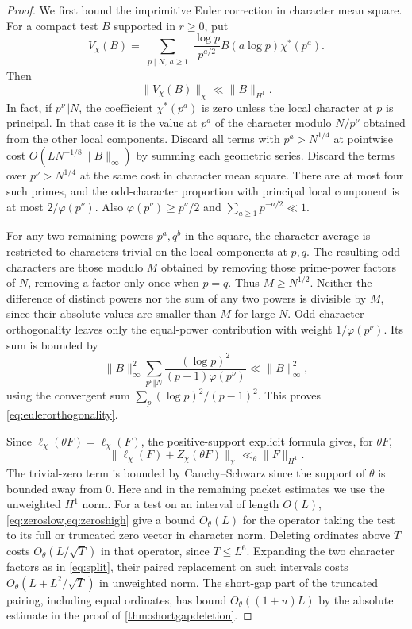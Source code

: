 \documentclass[11pt,a4paper]{article}
\numberwithin{equation}{section}
\begin{document}
\begin{proof}
We first bound the imprimitive Euler correction in character
mean square. For a compact test $B$ supported in $r\ge0$, put
\[
 V_\chi(B)=
 \sum_{\substack{p\mid N,\ a\ge1}}
       \frac{\log p}{p^{a/2}}B(a\log p)\chi^*(p^a).
\]
Then
\begin{equation}
 \|V_\chi(B)\|_\chi\ll \|B\|_{H^1}.
 \label{eq:eulerorthogonality}
\end{equation}
In fact, if $p^\nu\Vert N$, the coefficient $\chi^*(p^a)$
is zero unless the local character at $p$ is principal.
In that case it is the value at $p^a$ of the character
modulo $N/p^\nu$ obtained from the other local components.
Discard all terms with $p^a>N^{1/4}$ at pointwise cost
$O(LN^{-1/8}\|B\|_\infty)$ by summing each geometric series.
Discard the terms over $p^\nu>N^{1/4}$ at the same cost
in character mean square. There are at most four such
primes, and the odd-character proportion with principal
local component is at most $2/\varphi(p^\nu)$.
Also $\varphi(p^\nu)\ge p^\nu/2$ and
$\sum_{a\ge1}p^{-a/2}\ll1$.

For any two remaining powers $p^a,q^b$ in the square,
the character average is restricted to characters trivial
on the local components at $p,q$. The resulting odd
characters are those modulo $M$ obtained by removing those
prime-power factors of $N$, removing a factor only once
when $p=q$. Thus $M\ge N^{1/2}$. Neither the difference of
distinct powers nor the sum of any two powers is divisible
by $M$, since their absolute values are smaller than $M$
for large $N$. Odd-character orthogonality leaves only
the equal-power contribution with weight $1/\varphi(p^\nu)$.
Its sum is bounded by
\[
 \|B\|_\infty^2 \sum_{p^\nu\Vert N}
     \frac{(\log p)^2}{(p-1)\varphi(p^\nu)}
 \ll \|B\|_\infty^2,
\]
using the convergent sum $\sum_{p}(\log p)^2/(p-1)^2$.
This proves \cref{eq:eulerorthogonality}.

Since $\ell_\chi(\theta F)=\ell_\chi(F)$, the positive-support
explicit formula gives, for $\theta F$,
\[
 \bigl\|\ell_\chi(F)+Z_\chi(\theta F)\bigr\|_\chi
       \ll_\theta \|F\|_{H^1}.
\]
The trivial-zero term is bounded by Cauchy--Schwarz since
the support of $\theta$ is bounded away from $0$.
Here and in the remaining packet estimates we use the
unweighted $H^1$ norm. For a test on an interval of length
$O(L)$, \cref{eq:zeroslow,eq:zeroshigh} give a bound
$O_\theta(L)$ for the operator taking the test to its full
or truncated zero vector in character norm. Deleting
ordinates above $T$ costs $O_\theta(L/\sqrt T)$ in that
operator, since $T\le L^6$. Expanding the two character
factors as in \cref{eq:split}, their paired replacement
on such intervals costs $O_\theta(L+L^2/\sqrt T)$
in unweighted norm. The short-gap part of the truncated
pairing, including equal ordinates, has bound
$O_\theta((1+u)L)$ by the absolute estimate in the proof
of \cref{thm:shortgapdeletion}.


\end{proof}
\end{document}
